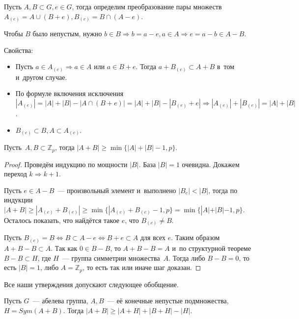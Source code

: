 \documentclass{article}
\begin{document}
Пусть $A, B \subset G, e \in G$, тогда определим преобразование пары множеств
$A_{(e)} = A \cup (B + e), B_{(e)} = B \cap (A - e)$.

Чтобы $B$ было непустым, нужно $b \in B \Rightarrow b = a - e, a \in A
\Rightarrow e = a - b \in A - B$.

Свойства:
\begin{itemize}
	\item Пусть $a \in A_{(e)} \Rightarrow a \in A$ или $a \in B + e$. Тогда
		$a + B_{(e)} \subset A + B$ в~том и~другом случае.
	\item По формуле включения исключения
		$|A_{(e)}| = |A| + |B| - |A \cap (B + e)| = |A| + |B| - |B_{(e)} + e|
		\Rightarrow |A_{(e)}| + |B_{(e)}| = |A| + |B|$.
	\item $B_{(e)} \subset B, A \subset A_{(e)}$.
\end{itemize}

\begin{theorem}
	Пусть~$A, B \subset \mathbb{Z}_p$, тогда $|A + B| \ge \min\{|A| + |B| - 1,
	p\}$.
\end{theorem}
\begin{proof}
	Проведём индукцию по мощности $|B|$. База $|B| = 1$ очевидна. Докажем переход
	$k \Rightarrow k + 1$.

	Пусть $e \in A - B$~--- произвольный элемент и~выполнено $|B_{e}| < |B|$,
	тогда по индукции $|A + B| \ge |A_{(e)} + B_{(e)}| \ge \min\{|A_{(e)} +
	B_{(e)} - 1, p\} = \min\{|A| + |B| - 1, p\}$. Осталось показать, что найдётся
	такое $e$, что $B_{(e)} \ne B$.

	Пусть $B_{(e)} = B \Leftrightarrow B \subset A - e \Leftrightarrow B + e
	\subset A$ для всех $e$. Таким образом $A + B - B \subset A$. Так как $0 \in B
	- B$, то $A + B - B = A$ и~по структурной теореме $B - B \subset H$, где
	$H$~--- группа симметрии множества~$A$. Тогда либо $B - B = 0$, то есть $|B| =
	1$, либо $A = \mathbb{Z}_p$, то есть так или иначе шаг доказан.
\end{proof}

Все наши утверждения допускают следующее обобщение.

\begin{theorem}[Кнезер]
	Пусть $G$~--- абелева группа, $A, B$~--- её конечные непустые подмножества, $H
	= Sym(A + B)$. Тогда $|A + B| \ge |A + H| + |B + H| - |H|$.
\end{theorem}
\end{document}
